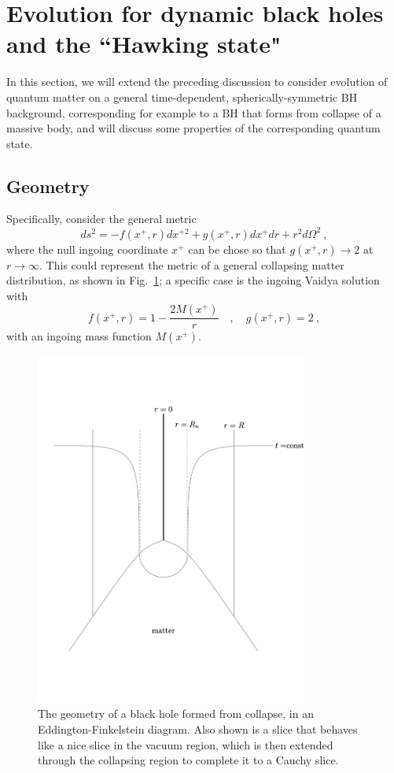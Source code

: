 \documentclass[11pt]{article}
\numberwithin{equation}{section}
\newcommand{\beq}{\begin{equation}}
\newcommand{\eeq}{\end{equation}}
\begin{document}
\section{Evolution for dynamic black holes and the ``Hawking state"}
\label{BHevol}

In this section, we will extend the preceding discussion to consider evolution of quantum matter on a general time-dependent, spherically-symmetric BH background, corresponding for example to a BH that forms from collapse of a massive body, and will discuss some properties of the corresponding quantum state.  

\subsection{Geometry}


Specifically, consider the general metric
\beq\label{gmet}
ds^2 = -f(x^+,r) dx^{+2} + g(x^+,r) dx^+ dr + r^2 d\Omega^2\ ,
\eeq
where the null ingoing coordinate $x^+$ can be chose so that  $g(x^+,r)\rightarrow 2$ at $r\rightarrow\infty$.  This could represent the metric of a general collapsing matter distribution, as shown in Fig.~\ref{Collapse}; a specific case is the ingoing Vaidya solution with
\beq \label{fVaid}
f(x^+,r)= 1-\frac{2M(x^+)}{r}\quad,\quad g(x^+,r)=2\ ,
\eeq
with an ingoing mass function $M(x^+)$.

\begin{figure}[!hbtp] \begin{center}
\includegraphics[width=9cm]{fig2largetext.pdf}
\end{center}
\caption{The geometry of a black hole formed from collapse, in an Eddington-Finkelstein diagram.  Also shown is a slice that behaves like a nice slice in the vacuum region, which is then extended through  the collapsing region to complete it to a Cauchy slice.}
\label{Collapse}
\end{figure} 
\end{document}
